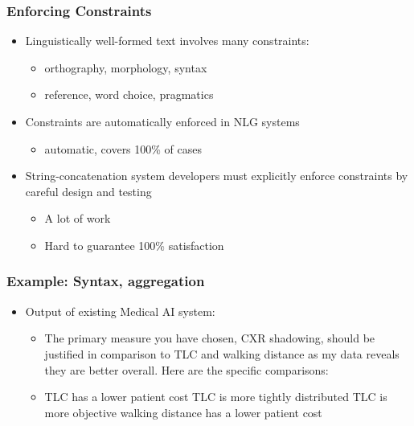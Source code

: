 \documentclass[compress,color=usenames]{beamer}
\begin{document}
\begin{frame}
\frametitle{Enforcing Constraints}

\label{f46}
\begin{itemize}
\item { {Linguistically well-formed text involves many constraints:}}
\begin{itemize}
\item orthography, morphology, syntax
\item reference, word choice, pragmatics
\end{itemize}
\item { {Constraints are automatically enforced in NLG systems}}
\begin{itemize}
\item automatic, covers 100\% of cases
\end{itemize}
\item { {String-concatenation system developers must explicitly enforce constraints by careful design and testing}}
\begin{itemize}
\item A lot of work
\item Hard to guarantee 100\% satisfaction
\end{itemize}
\end{itemize}

\end{frame}

\begin{frame}
\frametitle{Example: Syntax, aggregation}

\label{f48}
\begin{itemize}
\item { {Output of existing Medical AI system:}}
\begin{itemize}
\item The primary measure you have chosen, CXR shadowing, should be justified in comparison to TLC and walking distance as my data reveals they are better overall. Here are the specific comparisons:
\item TLC has a lower patient cost TLC is more tightly distributed TLC is more objective walking distance has a lower patient cost
\end{itemize}
\end{itemize}

\end{frame}
\end{document}
